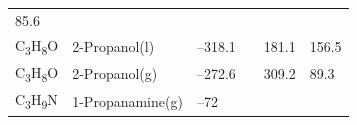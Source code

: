 \documentclass[
  9pt,
]{extbook}
\theoremstyle{definition}
\theoremstyle{definition}
\theoremstyle{definition}
\theoremstyle{remark}
\begin{document}
\begin{longtable}[]{@{}llllll@{}}
\begin{minipage}[t]{0.14\columnwidth}
85.6\strut
\end{minipage}\tabularnewline
\begin{minipage}[t]{0.07\columnwidth}\raggedright
C\textsubscript{3}H\textsubscript{8}O\strut
\end{minipage} & \begin{minipage}[t]{0.17\columnwidth}\raggedright
2-Propanol(l)\strut
\end{minipage} & \begin{minipage}[t]{0.15\columnwidth}\raggedright
--318.1\strut
\end{minipage} & \begin{minipage}[t]{0.15\columnwidth}\raggedright
\strut
\end{minipage} & \begin{minipage}[t]{0.14\columnwidth}\raggedright
181.1\strut
\end{minipage} & \begin{minipage}[t]{0.14\columnwidth}\raggedright
156.5\strut
\end{minipage}\tabularnewline
\begin{minipage}[t]{0.07\columnwidth}\raggedright
C\textsubscript{3}H\textsubscript{8}O\strut
\end{minipage} & \begin{minipage}[t]{0.17\columnwidth}\raggedright
2-Propanol(g)\strut
\end{minipage} & \begin{minipage}[t]{0.15\columnwidth}\raggedright
--272.6\strut
\end{minipage} & \begin{minipage}[t]{0.15\columnwidth}\raggedright
\strut
\end{minipage} & \begin{minipage}[t]{0.14\columnwidth}\raggedright
309.2\strut
\end{minipage} & \begin{minipage}[t]{0.14\columnwidth}\raggedright
89.3\strut
\end{minipage}\tabularnewline
\begin{minipage}[t]{0.07\columnwidth}\raggedright
C\textsubscript{3}H\textsubscript{9}N\strut
\end{minipage} & \begin{minipage}[t]{0.17\columnwidth}\raggedright
1-Propanamine(g)\strut
\end{minipage} & \begin{minipage}[t]{0.15\columnwidth}\raggedright
--72\strut
\end{minipage} & \begin{minipage}[t]{0.15\columnwidth}\raggedright

\end{minipage}
\end{longtable}
\end{document}
